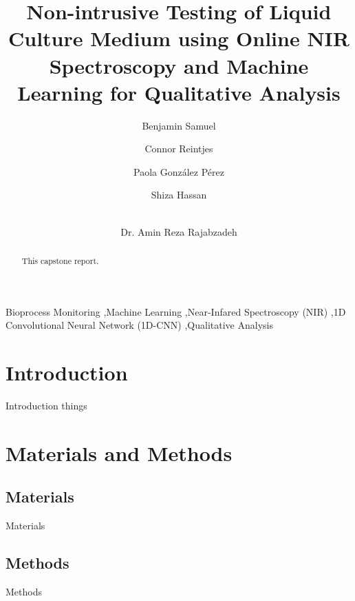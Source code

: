 \documentclass[final, 3p, 11pt]{elsarticle}
\begin{document}
\begin{frontmatter}


\title{Non-intrusive Testing of Liquid Culture Medium using Online NIR Spectroscopy and Machine Learning for Qualitative Analysis}

\author[1]{Benjamin Samuel}
\author[1]{Connor Reintjes}
\author[1]{Paola Gonz\'alez P\'erez}
\author[1]{Shiza Hassan}
\author[1]{\\Dr. Amin Reza Rajabzadeh} %



\begin{abstract}
This capstone report.
\end{abstract}

\begin{keyword}
Bioprocess Monitoring \sep Machine Learning \sep Near-Infared Spectroscopy (NIR) \sep 1D Convolutional Neural Network (1D-CNN) \sep Qualitative Analysis
\end{keyword}

\end{frontmatter}

\section{Introduction}
Introduction things \citep{AlamarBlueCellViability}

\section{Materials and Methods}
\subsection{Materials}
Materials

\subsection{Methods}
Methods
\end{document}
